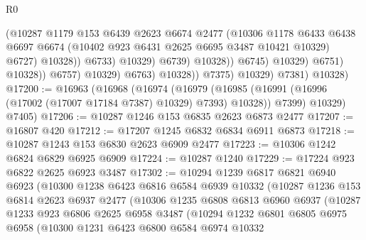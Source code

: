 \begin{lexlean}{R0}
\begin{coremodule}
                                            (@10287
                                              @1179
                                              @153
                                              @6439
                                              @2623
                                              @6674
                                              @2477
                                              (@10306
                                                @1178
                                                @6433
                                                @6438
                                                @6697
                                                @6674
                                                (@10402 @923 @6431 @2625 @6695 @3487 @10421 @10329)
                                                @6727)
                                              @10328))
                                          @6733)
                                        @10329)
                                      @6739)
                                    @10328))
                                @6745)
                              @10329)
                            @6751)
                          @10328))
                      @6757)
                    @10329)
                  @6763)
                @10328))
            @7375)
          @10329)
        @7381)
      @10328)
@17200 := @16963
    (@16968
      (@16974
        (@16979 (@16985 (@16991 (@16996 (@17002 (@17007 @17184 @7387) @10329) @7393) @10328)) @7399)
        @10329)
      @7405)
@17206 := @10287 @1246 @153 @6835 @2623 @6873 @2477
@17207 := @16807 @420
@17212 := @17207 @1245 @6832 @6834 @6911 @6873
@17218 := @10287 @1243 @153 @6830 @2623 @6909 @2477
@17223 := @10306 @1242 @6824 @6829 @6925 @6909
@17224 := @10287 @1240
@17229 := @17224 @923 @6822 @2625 @6923 @3487
@17302 := @10294
    @1239
    @6817
    @6821
    @6940
    @6923
    (@10300
      @1238
      @6423
      @6816
      @6584
      @6939
      @10332
      (@10287
        @1236
        @153
        @6814
        @2623
        @6937
        @2477
        (@10306
          @1235
          @6808
          @6813
          @6960
          @6937
          (@10287
            @1233
            @923
            @6806
            @2625
            @6958
            @3487
            (@10294
              @1232
              @6801
              @6805
              @6975
              @6958
              (@10300
                @1231
                @6423
                @6800
                @6584
                @6974
                @10332

\end{coremodule}
\end{lexlean}
